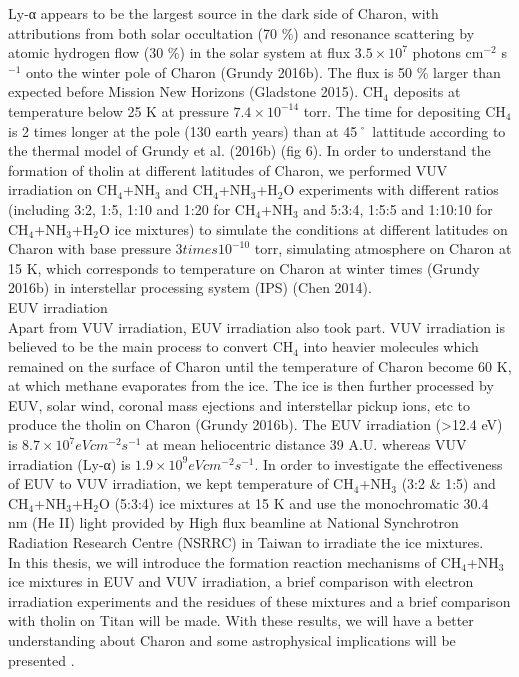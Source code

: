 Ly-α appears to be the largest source in the dark side of Charon, with attributions from both solar occultation (70 \%) and resonance scattering by atomic hydrogen flow (30 \%) in the solar system at flux $3.5 \times 10^7$ photons cm$^{-2}$ s$^{-1}$ onto the winter pole of Charon (Grundy 2016b). The flux is 50 \% larger than expected before Mission New Horizons (Gladstone 2015). CH$_4$ deposits at temperature below 25 K at pressure $7.4 \times 10^{-14}$ torr. The time for depositing CH$_4$ is 2 times longer at the pole (130 earth years) than at 45˚ lattitude according to the thermal model of Grundy et al. (2016b) (fig 6). In order to understand the formation of tholin at different latitudes of Charon, we performed VUV irradiation on CH$_4$+NH$_3$ and CH$_4$+NH$_3$+H$_2$O experiments with different ratios (including 3:2, 1:5, 1:10 and 1:20 for CH$_4$+NH$_3$ and 5:3:4, 1:5:5 and 1:10:10 for CH$_4$+NH$_3$+H$_2$O ice mixtures) to simulate the conditions at different latitudes on Charon with base pressure $3 times 10^{-10}$ torr, simulating atmosphere on Charon at 15 K, which corresponds to temperature on Charon at winter times (Grundy 2016b) in interstellar processing system (IPS) (Chen 2014).\\
EUV irradiation\\
Apart from VUV irradiation, EUV irradiation also took part. VUV irradiation is believed to be the main process to convert CH$_4$ into heavier molecules which remained on the surface of Charon until the temperature of Charon become 60 K, at which methane evaporates from the ice. The ice is then further processed by EUV, solar wind, coronal mass ejections and interstellar pickup ions, etc to produce the tholin on Charon (Grundy 2016b). The EUV irradiation (>12.4 eV) is $8.7 \times 10^7 eV cm^{-2} s^{-1}$ at mean heliocentric distance 39 A.U. whereas VUV irradiation (Ly-α) is $1.9 \times 10^9 eV cm^{-2} s^{-1}$. In order to investigate the effectiveness of EUV to VUV irradiation, we kept temperature of CH$_4$+NH$_3$ (3:2 \& 1:5) and CH$_4$+NH$_3$+H$_2$O (5:3:4) ice mixtures at 15 K and use the monochromatic 30.4 nm (He II) light provided by High flux beamline at National Synchrotron Radiation Research Centre (NSRRC) in Taiwan to irradiate the ice mixtures.\\

In this thesis, we will introduce the formation reaction mechanisms of CH$_4$+NH$_3$ ice mixtures in EUV and VUV irradiation, a brief comparison with electron irradiation experiments and the residues of these mixtures and a brief comparison with tholin on Titan will be made. With these results, we will have a better understanding about Charon and some astrophysical implications will be presented .\\
